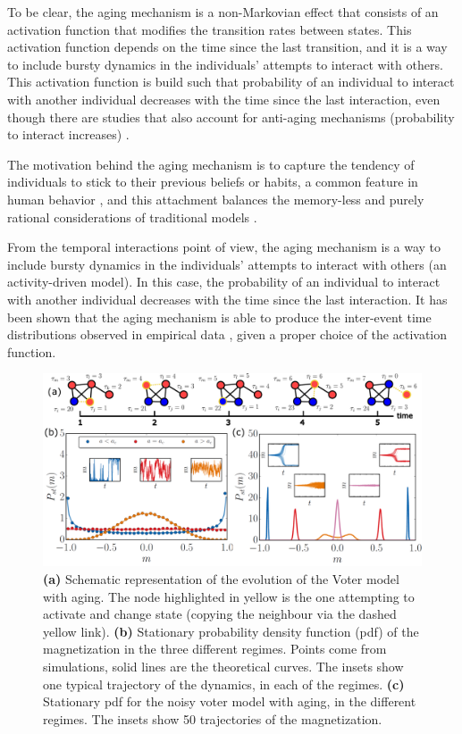 To be clear, the aging mechanism is a non-Markovian effect that consists of an activation function that modifies the transition rates between states. This activation function depends on the time since the last transition, and it is a way to include bursty dynamics in the individuals' attempts to interact with others. This activation function is build such that probability of an individual to interact with another individual decreases with the time since the last interaction, even though there are studies that also account for anti-aging mechanisms (probability to interact increases) \cite{peralta-2020,chen-2020}.

The motivation behind the aging mechanism is to capture the tendency of individuals to stick to their previous beliefs or habits, a common feature in human behavior \cite{granovetter-1973}, and this attachment balances the memory-less and purely rational considerations of traditional models \cite{granovetter-1985}.

From the temporal interactions point of view, the aging mechanism is a way to include bursty dynamics in the individuals' attempts to interact with others (an activity-driven model). In this case, the probability of an individual to interact with another individual decreases with the time since the last interaction. It has been shown that the aging mechanism is able to produce the inter-event time distributions observed in empirical data \cite{fernandez-gracia-2011}, given a proper choice of the activation function.
\begin{figure}[hb]
    \centering
    \captionsetup{font=sf}
    \includegraphics[width=\textwidth]{Figs/Introduction/aging_plot.pdf}
    \caption[Aging in the Voter model]{\textbf{(a)} Schematic representation of the evolution of the Voter model with aging. The node highlighted in yellow is the one attempting to activate and change state (copying the neighbour via the dashed yellow link). \textbf{(b)} Stationary probability density function (pdf) of the magnetization in the three different regimes. Points come from simulations, solid lines are the theoretical curves. The insets show one typical trajectory of the dynamics, in each of the regimes. \textbf{(c)} Stationary pdf for the noisy voter model with aging, in the different regimes. The insets show 50 trajectories of the magnetization.}
    \label{fig:aging_pdf}
\end{figure}


